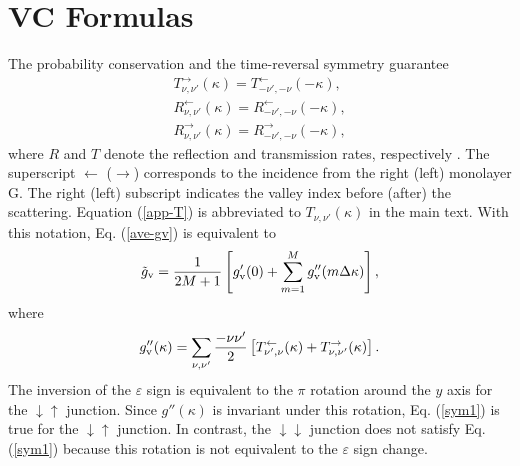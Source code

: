\documentclass{jpsj3}
\begin{document}
\section{VC Formulas}
The probability conservation 
and the time-reversal symmetry guarantee
\begin{eqnarray} 
T^{\rightarrow}_{\nu,\nu'}(\kappa)=T^{\leftarrow}_{-\nu',-\nu}(-\kappa),
\label{app-T}\\
R^{\leftarrow}_{\nu,\nu'}(\kappa)=R^{\leftarrow}_{-\nu',-\nu}(-\kappa)
\label{app-R-left},\\
R^{\rightarrow}_{\nu,\nu'}(\kappa)=R^{\rightarrow}_{-\nu',-\nu}(-\kappa),
\label{app-R-right}
\end{eqnarray}
where $R$ and $T$ denote the reflection and transmission rates, respectively \cite{a9.}.
The superscript $\leftarrow$ ($\rightarrow$) corresponds
to the incidence from the right (left) monolayer G.
The right (left) subscript indicates the valley
index before (after) the scattering.
Equation (\ref{app-T}) is abbreviated to $T_{\nu,\nu'}(\kappa)$ in
the main text. With this notation, Eq. (\ref{ave-gv}) 
is equivalent to
\begin{equation}
\tilde{g}_{\rm v}=\frac{1}{2M+1}\left[ 
g'_{\rm v}(0)+\sum_{m=1}^M g''_{\rm v}(m\Delta \kappa)
\right],
\end{equation}
where
\begin{equation}
g''_{\rm v}(\kappa)
=\sum_{\nu,\nu'}
\frac{-\nu\nu'}{2}
\left[
T_{\nu',\nu}^{\leftarrow}(\kappa)
+
T^{\rightarrow}_{\nu,\nu'}(\kappa)
\right].
\end{equation}
The inversion of the $\varepsilon$ sign is equivalent to the $\pi$ rotation
around the $y$ axis for the $\downarrow\uparrow$ junction.
Since $g''(\kappa)$ is invariant under this rotation, 
Eq. (\ref{sym1}) is true for
the $\downarrow\uparrow$ junction.
In contrast, the $\downarrow\downarrow$ junction
does not satisfy Eq. (\ref{sym1}) because
this rotation is not equivalent to the $\varepsilon$ sign change.
\end{document}
